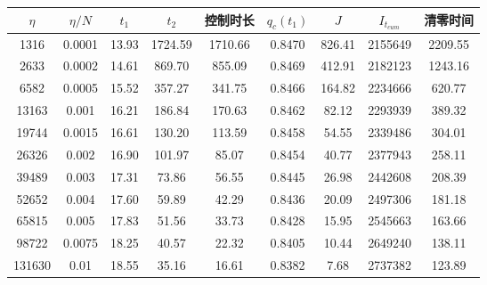 \begin{tabular}{ccccccccc}
\toprule
$\eta$ & $\eta/N$ & $t_1$ & $t_2$ & 控制时长 & $q_c(t_1)$ & $J$ & $I_{t_{cum}}$ & 清零时间 \\
\midrule
1316 & 0.0001 & 13.93 & 1724.59 & 1710.66 & 0.8470 & 826.41 & 2155649 & 2209.55 \\
2633 & 0.0002 & 14.61 & 869.70 & 855.09 & 0.8469 & 412.91 & 2182123 & 1243.16 \\
6582 & 0.0005 & 15.52 & 357.27 & 341.75 & 0.8466 & 164.82 & 2234666 & 620.77 \\
13163 & 0.001 & 16.21 & 186.84 & 170.63 & 0.8462 & 82.12 & 2293939 & 389.32 \\
19744 & 0.0015 & 16.61 & 130.20 & 113.59 & 0.8458 & 54.55 & 2339486 & 304.01 \\
26326 & 0.002 & 16.90 & 101.97 & 85.07 & 0.8454 & 40.77 & 2377943 & 258.11 \\
39489 & 0.003 & 17.31 & 73.86 & 56.55 & 0.8445 & 26.98 & 2442608 & 208.39 \\
52652 & 0.004 & 17.60 & 59.89 & 42.29 & 0.8436 & 20.09 & 2497306 & 181.18 \\
65815 & 0.005 & 17.83 & 51.56 & 33.73 & 0.8428 & 15.95 & 2545663 & 163.66 \\
98722 & 0.0075 & 18.25 & 40.57 & 22.32 & 0.8405 & 10.44 & 2649240 & 138.11 \\
131630 & 0.01 & 18.55 & 35.16 & 16.61 & 0.8382 & 7.68 & 2737382 & 123.89 \\
\bottomrule
\end{tabular}
